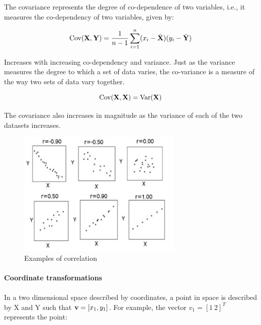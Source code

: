 \documentclass[11pt, oneside]{article}   	%
\begin{document}
The covariance represents the degree of co-dependence of two variables, i.e., it measures the co-dependency of two variables, given by:

\begin{equation}
   \text{Cov} ({\bf X}, {\bf Y}) = \frac{1}{n-1} \sum_{i=1}^{n} (x_i - \bar{ {\bf X}}) (y_i - \bar{ {\bf Y}})
\end{equation}

Increases with increasing co-dependency and variance. Just as the variance measures the degree to which a set of data varies, the co-variance is a measure of the way two sets of data vary together.

\begin{equation}
   \text{Cov} ({\bf X}, {\bf X}) = \text{Var}({\bf X})
\end{equation}

The covariance also increases in magnitude as the variance of each of the two datasets increases.


\begin{figure}[!h]
	\centering
	\includegraphics[width=0.7\textwidth]{examples-correlation}
	\caption{Examples of correlation}
	\label{fig:MeanVariance}
\end{figure}



\paragraph{Coordinate transformations}
\paragraph{}
In a two dimensional space described by coordinates, a point in space is described by X and Y such that ${\bf v} = [x_1, y_1]$. For example, the vector $v_1 = [1 ~2]^T$ represents the point:
\end{document}

